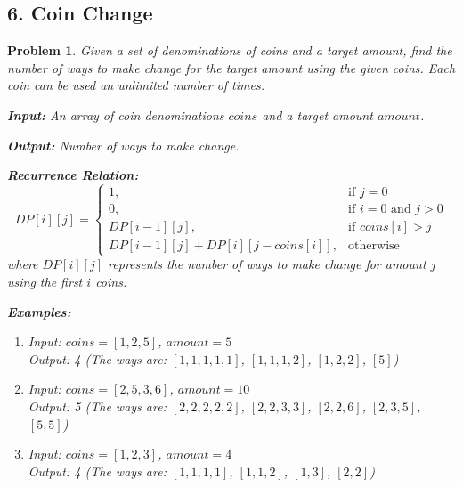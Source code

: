 \documentclass{article}
\newtheorem{problem}{Problem}
\begin{document}
\subsection*{6. Coin Change}
\begin{problem}
Given a set of denominations of coins and a target amount, find the number of ways to make change for the target amount using the given coins. Each coin can be used an unlimited number of times.

\textbf{Input:} An array of coin denominations $coins$ and a target amount $amount$.

\textbf{Output:} Number of ways to make change.

\textbf{Recurrence Relation:}
\[
DP[i][j] = 
\begin{cases}
1, & \text{if } j = 0 \\
0, & \text{if } i = 0 \text{ and } j > 0 \\
DP[i-1][j], & \text{if } coins[i] > j \\
DP[i-1][j] + DP[i][j-coins[i]], & \text{otherwise}
\end{cases}
\]
where $DP[i][j]$ represents the number of ways to make change for amount $j$ using the first $i$ coins.

\textbf{Examples:}
\begin{enumerate}
\item Input: $coins = [1, 2, 5]$, $amount = 5$ \\
      Output: 4 (The ways are: $[1,1,1,1,1]$, $[1,1,1,2]$, $[1,2,2]$, $[5]$)
\item Input: $coins = [2, 5, 3, 6]$, $amount = 10$ \\
      Output: 5 (The ways are: $[2,2,2,2,2]$, $[2,2,3,3]$, $[2,2,6]$, $[2,3,5]$, $[5,5]$)
\item Input: $coins = [1, 2, 3]$, $amount = 4$ \\
      Output: 4 (The ways are: $[1,1,1,1]$, $[1,1,2]$, $[1,3]$, $[2,2]$)
\end{enumerate}
\end{problem}

\end{document}
